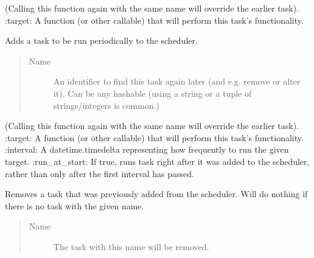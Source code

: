 \documentclass[letterpaper,10pt,english]{sphinxmanual}
\begin{document}
\begin{fulllineitems}
\begin{fulllineitems}
\begin{quote}
\begin{description}
\end{description}\end{quote}

(Calling this function again with the same name will override the earlier task).
:target: A function (or other callable) that will perform this task’s functionality.

\end{fulllineitems}


\begin{fulllineitems}
\label{\detokenize{periodic_tasks.task_scheduler:periodic_tasks.task_scheduler.TaskScheduler.add_periodic_task}}
Adds a task to be run periodically to the scheduler.
\begin{quote}\begin{description}
\item[{Name}] \leavevmode
An identifier to find this task again later (and e.g. remove or alter it). Can be any hashable (using a string or a tuple of strings/integers is common.)

\end{description}\end{quote}

(Calling this function again with the same name will override the earlier task).
:target: A function (or other callable) that will perform this task’s functionality.
:interval: A datetime.timedelta representing how frequently to run the given target.
:run\_at\_start: If true, runs task right after it was added to the scheduler, rather than only after the first interval has passed.

\end{fulllineitems}


\begin{fulllineitems}
\label{\detokenize{periodic_tasks.task_scheduler:periodic_tasks.task_scheduler.TaskScheduler.remove_task}}
Removes a task that was previously added from the scheduler.
Will do nothing if there is no task with the given name.
\begin{quote}\begin{description}
\item[{Name}] \leavevmode
The task with this name will be removed.


\end{description}
\end{quote}
\end{fulllineitems}
\end{fulllineitems}
\end{document}
